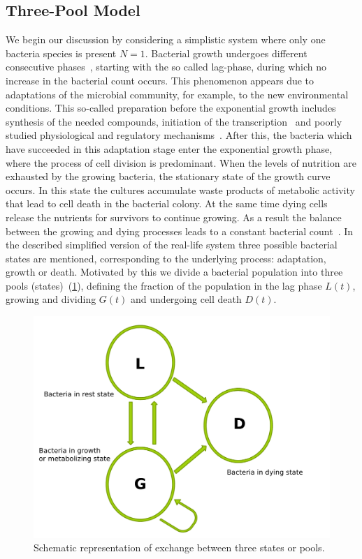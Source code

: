 \documentclass[10pt,twocolumn,5p]{elsarticle}
\numberwithin{equation}{section}
\begin{document}
\subsection{Three-Pool Model}
We begin our discussion by considering a simplistic system where only one bacteria species is present $N=1$.
Bacterial growth undergoes different consecutive phases~\cite{buchanan_when_1997}, starting with the so called lag-phase, during which no increase in the bacterial count occurs.
This phenomenon appears due to adaptations of the microbial community, for example, to the new environmental conditions.
This so-called preparation before the exponential growth includes synthesis of the needed compounds, initiation of the transcription~\cite{rolfe_lag_2012} and poorly studied physiological and regulatory mechanisms~\cite{monod_growth_1949}.
After this, the bacteria which have succeeded in this adaptation stage enter the exponential growth phase, where the process of cell division is predominant.
When the levels of nutrition are exhausted by the growing bacteria, the stationary state of the growth curve occurs.
In this state the cultures accumulate waste products of metabolic activity that lead to cell death in the bacterial colony.
At the same time dying cells release the nutrients for survivors to continue growing.
As a result the balance between the growing and dying processes leads to a constant bacterial count~\cite{navarro_llorens_stationary_2010}.
In the described simplified version of the real-life system three possible bacterial states are mentioned, corresponding to the underlying process: adaptation, growth or death.
Motivated by this we divide a bacterial population into three pools (states)~(\ref{fig:SchematicRep}), defining the fraction of the population in the lag phase $L(t)$, growing and dividing $G(t)$ and undergoing cell death $D(t)$.
\begin{figure}[t]
    \begin{center}
    \includegraphics[width=0.9\columnwidth]{Figures-TPM_fig.pdf}
    \caption{Schematic representation of exchange between three states or pools.}
    \label{fig:SchematicRep}
    \end{center}
\end{figure}
\end{document}
